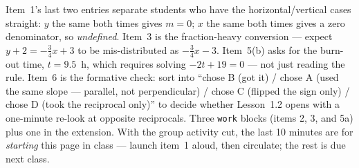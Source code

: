 \documentclass[10pt]{article}
\begin{document}
\begin{teachernote}[Homework]
Item~1's last two entries separate students who have the horizontal/vertical cases straight: $y$ the
same both times gives $m=0$; $x$ the same both times gives a zero denominator, so \emph{undefined}.
Item~3 is the fraction-heavy conversion --- expect $y+2=-\tfrac34x+3$ to be mis-distributed as
$-\tfrac34x-3$. Item~5(b) asks for the burn-out time, $t=9.5$~h, which requires solving
$-2t+19=0$ --- not just reading the rule. Item~6 is the formative check: sort into ``chose B (got it)
/ chose A (used the same slope --- parallel, not perpendicular) / chose C (flipped the sign only) /
chose D (took the reciprocal only)'' to decide whether Lesson~1.2 opens with a one-minute re-look at
opposite reciprocals. Three \texttt{work} blocks (items 2, 3, and 5a) plus one in the extension. With the group activity
cut, the last 10 minutes are for \emph{starting} this page in class --- launch item~1 aloud, then
circulate; the rest is due next class.
\end{teachernote}
\end{document}

